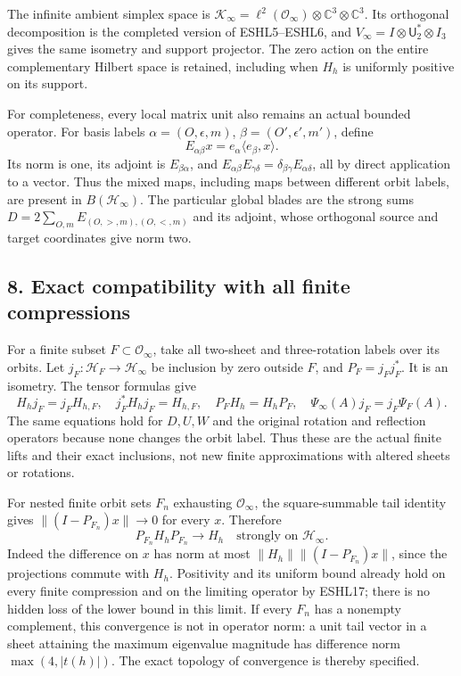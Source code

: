 \documentclass[
  10pt,
  a4paper,
]{article}
\begin{document}
The infinite ambient simplex space is
\(\mathcal K_\infty=\ell^2(\mathcal O_\infty)\otimes\mathbb C^3\otimes\mathbb C^3\).
Its orthogonal decomposition is the completed version of ESHL5--ESHL6,
and \(V_\infty=I\otimes\mathsf U_2^*\otimes I_3\) gives the same
isometry and support projector. The zero action on the entire
complementary Hilbert space is retained, including when \(H_h\) is
uniformly positive on its support.

For completeness, every local matrix unit also remains an actual bounded
operator. For basis labels \(\alpha=(O,\epsilon,m)\),
\(\beta=(O',\epsilon',m')\), define \[
E_{\alpha\beta}x=e_\alpha\langle e_\beta,x\rangle.
\tag{ESHL38}
\] Its norm is one, its adjoint is \(E_{\beta\alpha}\), and
\(E_{\alpha\beta}E_{\gamma\delta}=\delta_{\beta\gamma}E_{\alpha\delta}\),
all by direct application to a vector. Thus the mixed maps, including
maps between different orbit labels, are present in
\(B(\mathcal H_\infty)\). The particular global blades are the strong
sums \(D=2\sum_{O,m}E_{(O,>,m),(O,<,m)}\) and its adjoint, whose
orthogonal source and target coordinates give norm two.

\subsection{8. Exact compatibility with all finite
compressions}\label{exact-compatibility-with-all-finite-compressions}

For a finite subset \(F\subset\mathcal O_\infty\), take all two-sheet
and three-rotation labels over its orbits. Let
\(j_F:\mathcal H_F\to\mathcal H_\infty\) be inclusion by zero outside
\(F\), and \(P_F=j_Fj_F^*\). It is an isometry. The tensor formulas give
\[
H_hj_F=j_FH_{h,F},\quad j_F^*H_hj_F=H_{h,F},
\quad P_FH_h=H_hP_F,
\quad\Psi_\infty(A)j_F=j_F\Psi_F(A).
\tag{ESHL39}
\] The same equations hold for \(D,U,W\) and the original rotation and
reflection operators because none changes the orbit label. Thus these
are the actual finite lifts and their exact inclusions, not new finite
approximations with altered sheets or rotations.

For nested finite orbit sets \(F_n\) exhausting \(\mathcal O_\infty\),
the square-summable tail identity gives \(\|(I-P_{F_n})x\|\to0\) for
every \(x\). Therefore \[
P_{F_n}H_hP_{F_n}\longrightarrow H_h
\quad\text{strongly on }\mathcal H_\infty.
\tag{ESHL40}
\] Indeed the difference on \(x\) has norm at most
\(\|H_h\|\|(I-P_{F_n})x\|\), since the projections commute with \(H_h\).
Positivity and its uniform bound already hold on every finite
compression and on the limiting operator by ESHL17; there is no hidden
loss of the lower bound in this limit. If every \(F_n\) has a nonempty
complement, this convergence is not in operator norm: a unit tail vector
in a sheet attaining the maximum eigenvalue magnitude has difference
norm \(\max(4,|t(h)|)\). The exact topology of convergence is thereby
specified.
\end{document}
